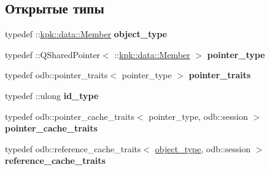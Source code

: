 \subsection*{Открытые типы}
\begin{DoxyCompactItemize}
\item 
typedef \+::\hyperlink{classkpk_1_1data_1_1_member}{kpk\+::data\+::\+Member} {\bfseries object\+\_\+type}\hypertarget{classodb_1_1access_1_1object__traits_3_01_1_1kpk_1_1data_1_1_member_01_4_accc81bb92dfc378a4fd134d701832a35}{}\label{classodb_1_1access_1_1object__traits_3_01_1_1kpk_1_1data_1_1_member_01_4_accc81bb92dfc378a4fd134d701832a35}

\item 
typedef \+::Q\+Shared\+Pointer$<$ \+::\hyperlink{classkpk_1_1data_1_1_member}{kpk\+::data\+::\+Member} $>$ {\bfseries pointer\+\_\+type}\hypertarget{classodb_1_1access_1_1object__traits_3_01_1_1kpk_1_1data_1_1_member_01_4_a1348e56f2141a3e9c1b3eb427f4b1f5f}{}\label{classodb_1_1access_1_1object__traits_3_01_1_1kpk_1_1data_1_1_member_01_4_a1348e56f2141a3e9c1b3eb427f4b1f5f}

\item 
typedef odb\+::pointer\+\_\+traits$<$ pointer\+\_\+type $>$ {\bfseries pointer\+\_\+traits}\hypertarget{classodb_1_1access_1_1object__traits_3_01_1_1kpk_1_1data_1_1_member_01_4_a57c3439c1f874104d0edea1ebc5f7d71}{}\label{classodb_1_1access_1_1object__traits_3_01_1_1kpk_1_1data_1_1_member_01_4_a57c3439c1f874104d0edea1ebc5f7d71}

\item 
typedef \+::ulong {\bfseries id\+\_\+type}\hypertarget{classodb_1_1access_1_1object__traits_3_01_1_1kpk_1_1data_1_1_member_01_4_a31695bf3986d21b67c0b296d0a7bc784}{}\label{classodb_1_1access_1_1object__traits_3_01_1_1kpk_1_1data_1_1_member_01_4_a31695bf3986d21b67c0b296d0a7bc784}

\item 
typedef odb\+::pointer\+\_\+cache\+\_\+traits$<$ pointer\+\_\+type, odb\+::session $>$ {\bfseries pointer\+\_\+cache\+\_\+traits}\hypertarget{classodb_1_1access_1_1object__traits_3_01_1_1kpk_1_1data_1_1_member_01_4_aa601f4ffcd411c5d1bc486daa4446228}{}\label{classodb_1_1access_1_1object__traits_3_01_1_1kpk_1_1data_1_1_member_01_4_aa601f4ffcd411c5d1bc486daa4446228}

\item 
typedef odb\+::reference\+\_\+cache\+\_\+traits$<$ \hyperlink{classkpk_1_1data_1_1_member}{object\+\_\+type}, odb\+::session $>$ {\bfseries reference\+\_\+cache\+\_\+traits}\hypertarget{classodb_1_1access_1_1object__traits_3_01_1_1kpk_1_1data_1_1_member_01_4_a73967f42aa4f35ce65199780fe20ea5a}{}\label{classodb_1_1access_1_1object__traits_3_01_1_1kpk_1_1data_1_1_member_01_4_a73967f42aa4f35ce65199780fe20ea5a}

\end{DoxyCompactItemize}

